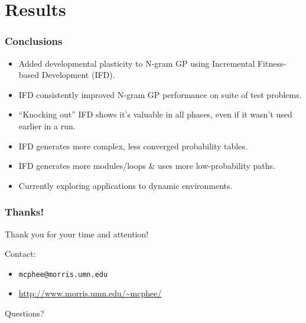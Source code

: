 \documentclass{beamer}
\newcommand{\linespace}{\vskip 0.25cm}
\begin{document}
\section[Results]{Results}

\begin{frame}
\frametitle{Conclusions}

\begin{itemize}
  \item Added developmental plasticity to N-gram GP using Incremental Fitness-based Development (IFD).
\end{itemize}

\begin{itemize}
  \item IFD consistently improved N-gram GP performance on suite of test problems.
  
  \linespace
  
  \item ``Knocking out'' IFD shows it's valuable in all phases, even if it wasn't used earlier in a run.

  \linespace
  
  \item IFD generates more complex, less converged probability tables.
  \item IFD generates more modules/loops \& uses more low-probability paths.
\end{itemize}

\begin{itemize}
  \item Currently exploring applications to dynamic environments.
\end{itemize}

\end{frame}

\begin{frame}
	\frametitle{Thanks!}
	
	Thank you for your time and attention!
		
	\linespace
	\linespace
	
	Contact:  
	\begin{itemize}
		\item \texttt{mcphee@morris.umn.edu}
		\item \url{http://www.morris.umn.edu/~mcphee/}
	\end{itemize}
	
	\linespace
	\linespace
	
	\begin{center}
	{\huge Questions?}
	\end{center}
\end{frame}
\end{document}
